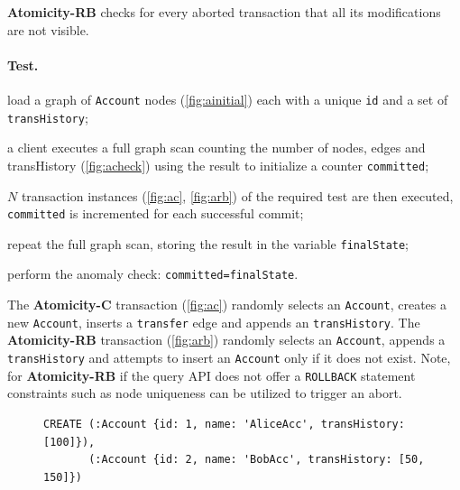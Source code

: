 {\flushleft \textbf{Atomicity-RB}} checks for every aborted transaction that all
its modifications are not visible.

\paragraph{Test.}
\begin{enumerate*}[label={(\roman*)}]
  \item load a graph of \texttt{Account} nodes (\autoref{fig:ainitial}) each 
        with a unique \texttt{id} and a set of \texttt{transHistory};
  \item a client executes a full graph scan counting the number of nodes, edges
        and transHistory (\autoref{fig:acheck}) using the result to initialize a
        counter \texttt{committed};
  \item $N$ transaction instances (\autoref{fig:ac}, \autoref{fig:arb}) of the
        required test are then executed, \texttt{committed} is incremented for
        each successful commit;
  \item repeat the full graph scan, storing the result in the variable
        \texttt{finalState};
  \item perform the anomaly check: \texttt{committed=finalState}.
\end{enumerate*}

The \textbf{Atomicity-C} transaction (\autoref{fig:ac}) randomly selects an
\texttt{Account}, creates a new \texttt{Account}, inserts a \texttt{transfer} 
edge and appends an \texttt{transHistory}. The \textbf{Atomicity-RB} transaction
(\autoref{fig:arb}) randomly selects an \texttt{Account}, appends a 
\texttt{transHistory} and attempts to insert an \texttt{Account} only if it does
not exist. Note, for \textbf{Atomicity-RB} if the query API does not offer a
\texttt{ROLLBACK} statement constraints such as node uniqueness can be utilized
to trigger an abort.

\begin{figure}[htb]
\centering

\begin{lstlisting}[language=cypher,label=fig:ainitial,caption=Cypher query for creating initial data for the \tx{Atomicity} transactions.]
CREATE (:Account {id: 1, name: 'AliceAcc', transHistory: [100]}),
       (:Account {id: 2, name: 'BobAcc', transHistory: [50, 150]})
\end{lstlisting}

\end{figure}

